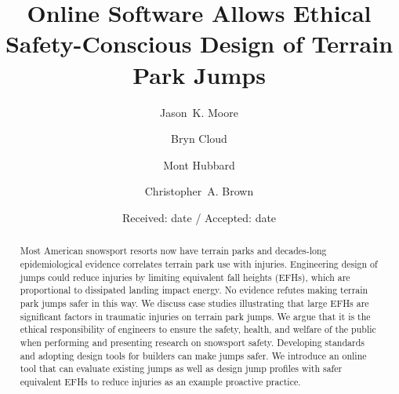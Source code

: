 \documentclass[smallextended]{svjour3}       %
\begin{document}
\title{Online Software Allows Ethical Safety-Conscious Design of Terrain Park Jumps}

\author{
  Jason~K. Moore \and
  Bryn Cloud \and
  Mont Hubbard \and
  Christopher~A. Brown
}


\date{Received: date / Accepted: date}

\maketitle

\begin{abstract}
  Most American snowsport resorts now have terrain parks and decades-long
  epidemiological evidence correlates terrain park use with injuries.
  Engineering design of jumps could reduce injuries by limiting equivalent fall
  heights (EFHs), which are proportional to dissipated landing impact energy. No evidence
  refutes making terrain park jumps safer in this way. We discuss case studies
  illustrating that large EFHs are significant factors in traumatic injuries on
  terrain park jumps. We argue that it is the ethical responsibility of
  engineers to ensure the safety, health, and welfare of the public when
  performing and presenting research on snowsport safety. Developing standards
  and adopting design tools for builders can make jumps safer. We introduce an
  online tool that can evaluate existing jumps as well as design jump profiles with
  safer equivalent EFHs to reduce injuries as an example proactive practice.
\end{abstract}
\end{document}
